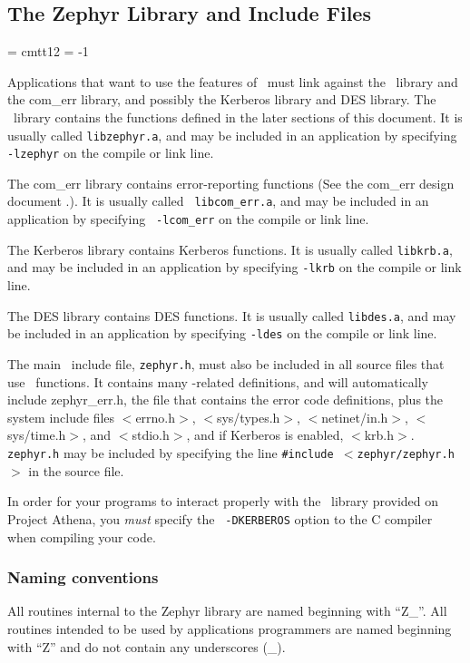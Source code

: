 %
\subsection{The Zephyr Library and Include Files}
\label{library-include}
\font\twlttreal  = cmtt12               %
    \hyphenchar\twlttreal = -1         %

Applications that want to use the features of \Zephyr\ must link
against the \Zephyr\ library and the com_err library, and possibly the
Kerberos library and DES library.  The \Zephyr\ library contains the functions
defined in the later sections of this document.  It is usually called
{\tt libzephyr.a}, and may be included in an application by specifying
{\tt -lzephyr} on the compile or link line.  

The com_err library contains error-reporting functions (See the com_err
design document \cite{comerr-paper}.).  It is usually called {\tt \twlttreal
libcom_err.a}, and may be included in an application by specifying {\tt
\twlttreal -lcom_err} on the compile or link line.

The Kerberos library contains Kerberos functions.  It is usually called
{\tt libkrb.a}, and may be included in an application by specifying
{\tt -lkrb} on the compile or link line.

The DES library contains DES functions.  It is usually called
{\tt libdes.a}, and may be included in an application by specifying
{\tt -ldes} on the compile or link line.

The main \Zephyr\ include file, {\tt zephyr.h}, must also be included
in all source files that use \Zephyr\ functions.  It contains many
\Zephyr-related definitions, and will automatically include
zephyr_err.h, the file that contains the error code definitions, plus
the system include files $<$errno.h$>$, $<$sys/types.h$>$,
$<$netinet/in.h$>$, $<$sys/time.h$>$, and $<$stdio.h$>$, and if Kerberos
is enabled, $<$krb.h$>$.
{\tt zephyr.h} may be included by specifying the line {\tt \#include
$<$zephyr/zephyr.h$>$} in the source file.

In order for your programs to interact properly with the \Zephyr\
library provided on Project Athena, you {\em must\/} specify the {\tt
-DKERBEROS} option to the C compiler when compiling your code.

\subsubsection{Naming conventions}
\label{naming-conventions}
All routines internal to the Zephyr library are named beginning with
``Z_''.  All routines intended to be used by applications programmers are
named beginning with ``Z'' and do not contain any underscores (_).
